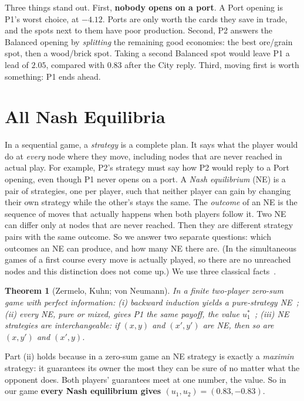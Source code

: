 \documentclass[11pt]{article}
\newtheorem{theorem}{Theorem}
\begin{document}
\begin{table}[h]\centering\small
\handtable
\caption{The two players in the equilibrium. P1's lead is $26.43-25.60=0.83$.}\label{tab:hands}
\end{table}

Three things stand out. First, \textbf{nobody opens on a port}. A Port opening is P1's worst choice, at $-4.12$. Ports are only worth the cards they save in trade, and the spots next to them have poor production. Second, P2 answers the Balanced opening by \emph{splitting} the remaining good economies: the best ore/grain spot, then a wood/brick spot. Taking a second Balanced spot would leave P1 a lead of $2.05$, compared with $0.83$ after the City reply. Third, moving first is worth something: P1 ends ahead.


\section{All Nash Equilibria}\label{sec:ne}
In a sequential game, a \emph{strategy} is a complete plan. It says what the player would do at \emph{every} node where they move, including nodes that are never reached in actual play. For example, P2's strategy must say how P2 would reply to a Port opening, even though P1 never opens on a port. A \emph{Nash equilibrium} (NE) is a pair of strategies, one per player, such that neither player can gain by changing their own strategy while the other's stays the same. The \emph{outcome} of an NE is the sequence of moves that actually happens when both players follow it. Two NE can differ only at nodes that are never reached. Then they are different strategy pairs with the same outcome. So we answer two separate questions: which outcomes an NE can produce, and how many NE there are. (In the simultaneous games of a first course every move is actually played, so there are no unreached nodes and this distinction does not come up.) We use three classical facts~\cite{osborne}.

\begin{theorem}[Zermelo, Kuhn; von Neumann]\label{thm:minimax}
In a finite two-player zero-sum game with perfect information:
(i) backward induction yields a pure-strategy NE~\cite{zermelo,kuhn};
(ii) every NE, pure or mixed, gives P1 the same payoff, the \emph{value} $u_1^*$~\cite{vonneumann};
(iii) NE strategies are \emph{interchangeable}: if $(x,y)$ and $(x',y')$ are NE, then so are $(x,y')$ and $(x',y)$.
\end{theorem}
Part (ii) holds because in a zero-sum game an NE strategy is exactly a \emph{maximin} strategy: it guarantees its owner the most they can be sure of no matter what the opponent does. Both players' guarantees meet at one number, the value. So in our game \textbf{every Nash equilibrium gives $(u_1,u_2)=(0.83,-0.83)$}.
\end{document}
